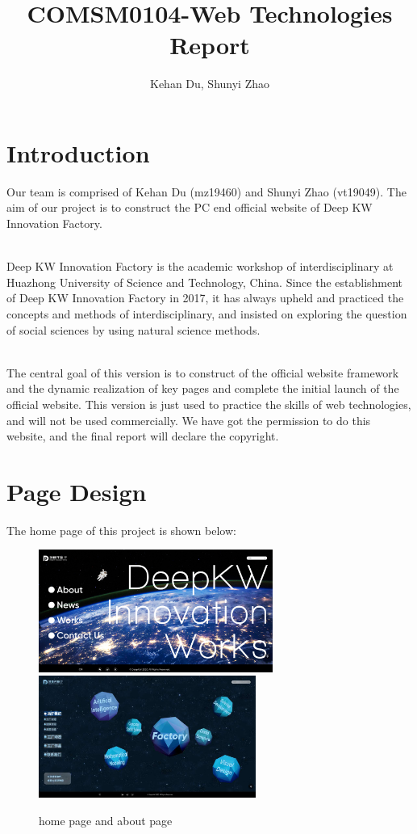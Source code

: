 \documentclass{article}
\title{COMSM0104-Web Technologies Report}
\author{Kehan Du, Shunyi Zhao}
\begin{document}
\maketitle

\section{Introduction}
Our team is comprised of Kehan Du (mz19460) and Shunyi Zhao (vt19049). The
aim of our project is to construct the PC end official website of Deep KW
Innovation Factory.

~\\
\noindent
Deep KW Innovation Factory is the academic workshop of interdisciplinary 
at Huazhong University of Science and Technology, China. Since the establishment 
of Deep KW Innovation Factory in 2017, it has always upheld and practiced 
the concepts and methods of interdisciplinary, and insisted on exploring 
the question of social sciences by using natural science methods.

~\\
\noindent
The central goal of this version is to construct of the official website 
framework and the dynamic realization of key pages and complete the initial 
launch of the official website. This version is just used to practice the skills
of web technologies, and will not be used commercially. We have got the
permission to do this website, and the final report will declare the copyright.

\section{Page Design}
The home page of this project is shown below:
\\
\begin{figure}[h]
    \centering
    \includegraphics[height=4cm]{img/02.png}
    \includegraphics[height=4cm]{img/05.jpg}
    \caption{home page and about page}
    \label{fig: figure1}
\end{figure}
\\
\end{document}
